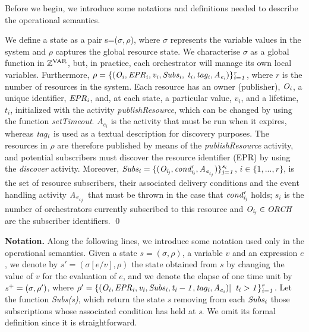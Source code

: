 Before we begin, we introduce some notations and definitions needed to describe the operational semantics.
\begin{definition}[State] %
We define a state as a pair s=($\sigma, \rho$), where $\sigma$ represents the variable values in the system and $\rho$ captures the global resource state. We characterise $\sigma$ as a global function in ${\it \mathbb{Z}^\textrm{VAR}}$, but, in practice, each orchestrator will manage its own local variables. Furthermore, $\it{ \rho=\{(O_i,EPR_i,v_i,Subs_i,}$ $\it{ t_i,tag_i,A_{e{_i}})\}_{i=1}^r}$, where $r$ is the number of resources in the system. Each resource has an owner (publisher), ${\it O_i}$, a unique identifier, ${\it EPR_i}$, and, at each state, a particular value, $v_i$, and a lifetime, $t_i$, initialized with the activity {\it publishResource}, which can be changed by using the function {\it setTimeout}. $A_{e{_i}}$ is the activity that must be run when it expires, whereas ${\it tag_i}$ is used as a textual description for discovery purposes. The resources in $\rho$ are therefore published by means of the {\em publishResource} activity, and potential subscribers must discover the resource identifier (EPR) by using the {\it discover} activity. %
Moreover, $\it{Subs_i=\{(O_{i_{j}},cond'_{i_{j}},A_{e{_{_i{_{_j}}}}})\}_{j=1}^{{s_i}}}$, $i \in \{1,...,r\}$, is the set of resource subscribers, their associated delivery conditions and the event handling activity ${\it A_{e{_{_i{_{_j}}}}}}$ that must be thrown in the case that ${\it cond'_{i_{j}}}$ holds; $s_i$ is the number of orchestrators currently subscribed to this resource and ${\it O_{i_{j}} \in ORCH}$ are the subscriber identifiers.
\qed
\end{definition}

{\bf Notation.} Along the following lines, we introduce some notation used only in the operational semantics. Given a state $s=(\sigma,\rho)$, a variable $v$ and an expression $e$, we denote by $s'=(\sigma[e/v],\rho)$ the state obtained from $s$
by changing the value of $v$ for the evaluation of $e$, and we denote the elapse of one time unit by ${\it s{^+}=(\sigma,\rho')}$, where ${\it \rho'=\{(O_i,EPR_i,v_i,Subs_i,t_i-1,tag_i,A_{e{_i}})|}$ ${\it t_i>1\}_{i=1}^r}$. Let the function {\it Subs(s)}, which return the state {\it s} removing from each ${\it Subs_i}$ those subscriptions whose associated condition has held at {\it s}. %
We omit its formal definition since it is straightforward.


